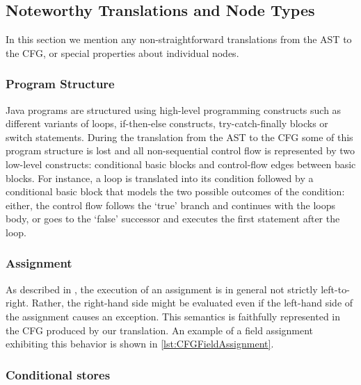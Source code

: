\subsection{Noteworthy Translations and Node Types}
\label{sec:noteworthy-translations}

In this section we mention any non-straightforward translations from the AST to
the CFG, or special properties about individual nodes.


\subsubsection{Program Structure}
\label{sec:prog-structure}

Java programs are structured using high-level programming constructs such as
different variants of loops, if-then-else constructs, try-catch-finally blocks
or switch statements.  During the translation from the AST to the CFG some
of this program structure is lost and all non-sequential control flow is
represented by two low-level constructs: conditional basic blocks and
control-flow edges between basic blocks. For instance, a  loop is translated
into its condition followed by a conditional basic block that models the two
possible outcomes of the condition: either, the control flow follows the
`true' branch and continues with the loops body, or goes to the `false'
successor and executes the first statement after the loop.


\subsubsection{Assignment}

As described in , the execution of an assignment is in general
not strictly left-to-right. Rather, the right-hand side might be evaluated even
if the left-hand side of the assignment causes an exception. This semantics is faithfully
represented in the CFG produced by our translation.
An example of a field assignment exhibiting this behavior is shown in \autoref{lst:CFGFieldAssignment}.



\subsubsection{Conditional stores}

